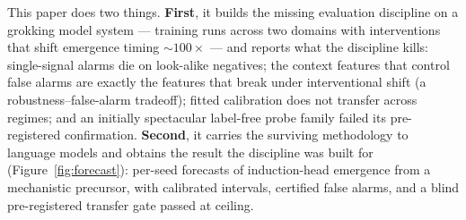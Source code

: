 \documentclass[11pt]{article}
\begin{document}
This paper does two things. \textbf{First}, it builds the missing evaluation discipline
on a grokking model system --- \vCorpus{} training runs across two domains with
interventions that shift emergence timing ${\sim}100\times$ --- and reports what the
discipline kills: single-signal alarms die on look-alike negatives; the context features
that control false alarms are exactly the features that break under interventional
shift (a robustness--false-alarm tradeoff); fitted calibration does not transfer across
regimes; and an initially spectacular label-free probe family failed its pre-registered
confirmation. \textbf{Second}, it carries the surviving methodology to language models
and obtains the result the discipline was built for
(Figure~\ref{fig:forecast}): per-seed forecasts of induction-head emergence from a
mechanistic precursor, with calibrated intervals, certified false alarms, and a blind
pre-registered transfer gate passed at ceiling.
\end{document}
